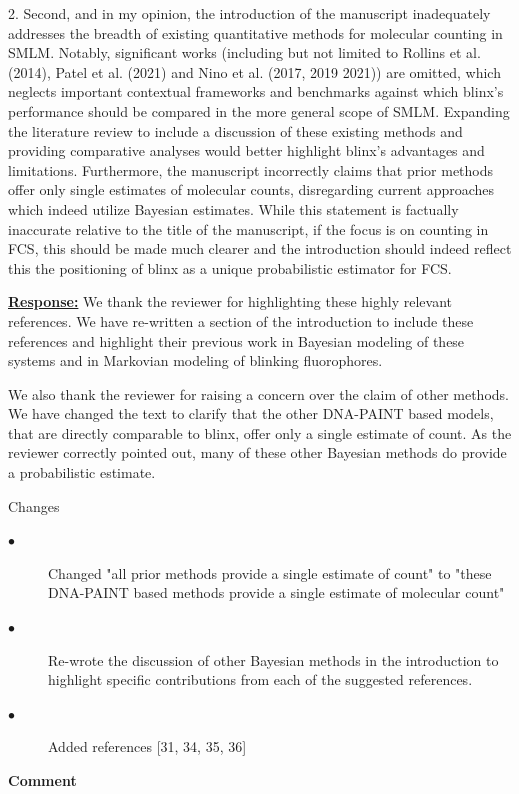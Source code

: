 \documentclass{article}
\begin{document}
2. Second, and in my opinion, the introduction of the manuscript inadequately addresses the 
breadth of existing quantitative methods for molecular counting in SMLM. Notably, significant works 
(including but not limited to Rollins et al. (2014), Patel et al. (2021) and Nino et al. (2017, 2019 2021)) 
are omitted, which neglects important contextual frameworks and benchmarks against which 
blinx's performance should be compared in the more general scope of SMLM. 
Expanding the literature review to include a discussion of these existing methods and providing 
comparative analyses would better highlight blinx's advantages and limitations. 
Furthermore, the manuscript incorrectly claims that prior methods offer only single estimates of 
molecular counts, disregarding current approaches which indeed utilize Bayesian estimates. 
While this statement is factually inaccurate relative to the title of the manuscript, if the 
focus is on counting in FCS, this should be made much clearer and the introduction should indeed 
reflect this the positioning of blinx as a unique probabilistic estimator for FCS.

\underline{\textbf{Response:}}
We thank the reviewer for highlighting these highly relevant references. We have re-written a section of 
the introduction to include these references and highlight their previous work in Bayesian modeling of 
these systems and in Markovian modeling of blinking fluorophores.

We also thank the reviewer for raising a concern over the claim of other methods. We have changed the text to 
clarify that the other DNA-PAINT based models, that are directly comparable to blinx, offer only a single estimate 
of count. As the reviewer correctly pointed out, many of these other Bayesian methods do provide a probabilistic 
estimate.

Changes
\begin{description}
    \item[$\bullet$] Changed "all prior methods provide a single estimate of count" to 
    "these DNA-PAINT based methods provide a single estimate of molecular count"
    \item[$\bullet$] Re-wrote the discussion of other Bayesian methods in the introduction 
    to highlight specific contributions from each of the suggested references. 
    \item[$\bullet$] Added references [31, 34, 35, 36]
\end{description}

\textbf{Comment}
\end{document}
